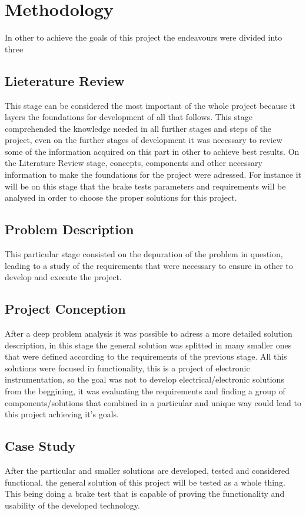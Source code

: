 \chapter{Methodology}\label{ch:methodology}

	In other to achieve the goals of this project the endeavours were divided into three 

	\section{Lieterature Review}\label{sec:literature-review}
		This stage can be considered the most important of the whole project because it layers the foundations for development of all that follows. This stage comprehended the knowledge needed in all further stages and steps of the project, even on the further stages of development it was necessary to review some of the information acquired on this part in other to achieve best results. On the Literature Review stage, concepts, components and other necessary information to make the foundations for the project were adressed. For instance it will be on this stage that the brake tests parameters and requirements will be analysed in order to choose the proper solutions for this project.

	\section{Problem Description}\label{sec:problem-description}
		This particular stage consisted on the depuration of the problem in question, leading to a study of the requirements that were necessary to ensure in other to develop and execute the project. 

	\section{Project Conception}\label{sec:project-conception}
		After a deep problem analysis it was possible to adress a more detailed solution description, in this stage the general solution was splitted in many smaller ones that were defined according to the requirements of the previous stage. All this solutions were focused in functionality, this is a project of electronic instrumentation, so the goal was not to develop electrical/electronic solutions from the beggining, it was evaluating the requirements and finding a group of components/solutions that combined in a particular and unique way could lead to this project achieving it's goals.
		
	\section{Case Study}\label{sec:case-study}
		After the particular and smaller solutions are developed, tested and considered functional, the general solution of this project will be tested as a whole thing. This being doing a brake test that is capable of proving the functionality and usability of the developed technology.
